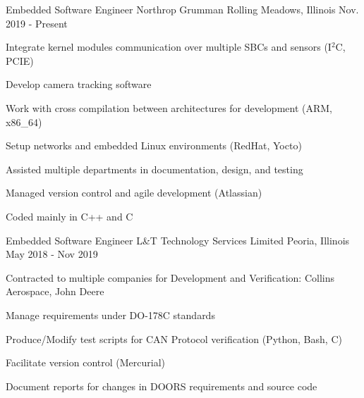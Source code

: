 


\begin{cventries}

\cventry
{Embedded Software Engineer} %
{Northrop Grumman} %
{Rolling Meadows, Illinois} %
{Nov. 2019 - Present} %
{ %
\begin{cvitems}
\item {Integrate kernel modules communication over multiple SBCs and sensors (I$^2$C, PCIE)} 
\item {Develop camera tracking software}
\item {Work with cross compilation between architectures for development (ARM, x86\_64)}
\item {Setup networks and embedded Linux environments (RedHat, Yocto)}
\item {Assisted multiple departments in documentation, design, and testing}
\item {Managed version control and agile development (Atlassian)}
\item {Coded mainly in C++ and C}
\end{cvitems}
}

\cventry
{Embedded Software Engineer} %
{L\&T Technology Services Limited} %
{Peoria, Illinois} %
{May 2018 - Nov 2019} %
{ %
\begin{cvitems}
\item {Contracted to multiple companies for Development and Verification: Collins Aerospace, John Deere}
\item {Manage requirements under DO-178C standards}
\item {Produce/Modify test scripts for CAN Protocol verification (Python, Bash, C)}
\item {Facilitate version control (Mercurial) }
\item {Document reports for changes in DOORS requirements and source code}
\end{cvitems}
}


\end{cventries}
